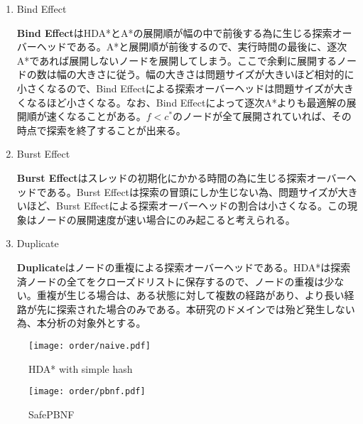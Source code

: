 \documentclass[uplatex]{jsarticle}
\begin{document}
\begin{enumerate}
\item Bind Effect
\vspace{3mm}

\textbf{Bind Effect}はHDA*とA*の展開順が幅の中で前後する為に生じる探索オーバーヘッドである。A*と展開順が前後するので、実行時間の最後に、逐次A*であれば展開しないノードを展開してしまう。ここで余剰に展開するノードの数は幅の大きさに従う。幅の大きさは問題サイズが大きいほど相対的に小さくなるので、Bind Effectによる探索オーバーヘッドは問題サイズが大きくなるほど小さくなる。なお、Bind Effectによって逐次A*よりも最適解の展開順が速くなることがある。$f < c^*$のノードが全て展開されていれば、その時点で探索を終了することが出来る。
\newline

\item Burst Effect
\vspace{3mm}

\textbf{Burst Effect}はスレッドの初期化にかかる時間の為に生じる探索オーバーヘッドである。Burst Effectは探索の冒頭にしか生じない為、問題サイズが大きいほど、Burst Effectによる探索オーバーヘッドの割合は小さくなる。この現象はノードの展開速度が速い場合にのみ起こると考えられる。
\newline

\item Duplicate
\vspace{3mm}

\textbf{Duplicate}はノードの重複による探索オーバーヘッドである。HDA*は探索済ノードの全てをクローズドリストに保存するので、ノードの重複は少ない。重複が生じる場合は、ある状態に対して複数の経路があり、より長い経路が先に探索された場合のみである。本研究のドメインでは殆ど発生しない為、本分析の対象外とする。

\end{enumerate}
\begin{comment}
\begin{figure}[h]
	\centering
	\texttt{[image: order/naive.pdf]}
	\caption{HDA* with simple hash}
	\label{fig:order_naive_hash}
\end{figure}
\begin{figure}[h]
	\centering
	\texttt{[image: order/pbnf.pdf]}
	\caption{SafePBNF}
	\label{fig:order_safepbnf}
\end{figure}
\end{comment}

\begin{figure}[h]
	\centering
	\begin{minipage}{0.45\columnwidth}
		\centering
		\texttt{[image: order/naive.pdf]}
		\caption{HDA* with simple hash}
		\label{fig:order_naive_hash}
	\end{minipage}
	\begin{minipage}{0.45\columnwidth}
		\centering
		\texttt{[image: order/pbnf.pdf]}
		\caption{SafePBNF}
		\label{fig:order_safepbnf}
	\end{minipage}
\end{figure}
\end{document}
